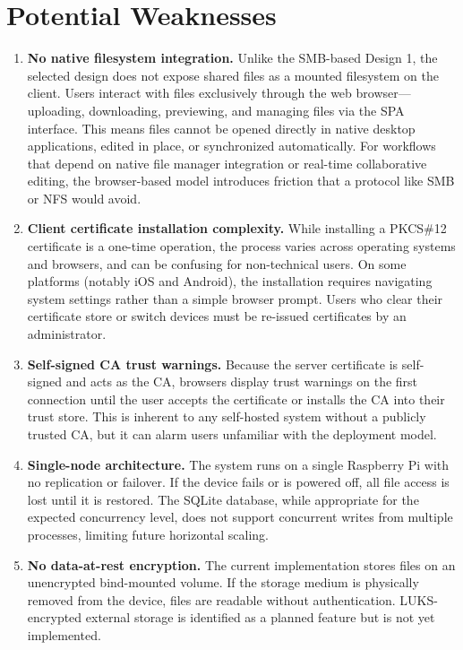 \documentclass[12pt,letterpaper]{report}
\begin{document}
\section{Potential Weaknesses}

\begin{enumerate}
    \item \textbf{No native filesystem integration.} Unlike the SMB-based Design 1, the selected design does not expose shared files as a mounted filesystem on the client. Users interact with files exclusively through the web browser---uploading, downloading, previewing, and managing files via the SPA interface. This means files cannot be opened directly in native desktop applications, edited in place, or synchronized automatically. For workflows that depend on native file manager integration or real-time collaborative editing, the browser-based model introduces friction that a protocol like SMB or NFS would avoid.

    \item \textbf{Client certificate installation complexity.} While installing a PKCS\#12 certificate is a one-time operation, the process varies across operating systems and browsers, and can be confusing for non-technical users. On some platforms (notably iOS and Android), the installation requires navigating system settings rather than a simple browser prompt. Users who clear their certificate store or switch devices must be re-issued certificates by an administrator.

    \item \textbf{Self-signed CA trust warnings.} Because the server certificate is self-signed and acts as the CA, browsers display trust warnings on the first connection until the user accepts the certificate or installs the CA into their trust store. This is inherent to any self-hosted system without a publicly trusted CA, but it can alarm users unfamiliar with the deployment model.

    \item \textbf{Single-node architecture.} The system runs on a single Raspberry Pi with no replication or failover. If the device fails or is powered off, all file access is lost until it is restored. The SQLite database, while appropriate for the expected concurrency level, does not support concurrent writes from multiple processes, limiting future horizontal scaling.

    \item \textbf{No data-at-rest encryption.} The current implementation stores files on an unencrypted bind-mounted volume. If the storage medium is physically removed from the device, files are readable without authentication. LUKS-encrypted external storage is identified as a planned feature but is not yet implemented.
\end{enumerate}
\end{document}
